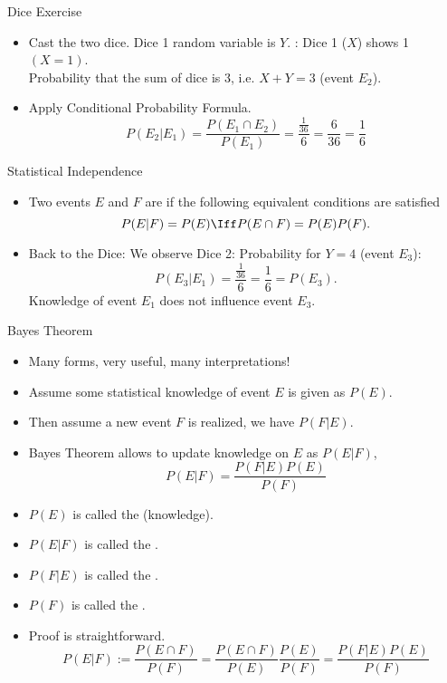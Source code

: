 \documentclass[9pt]{beamer}
\newcommand{\myemph}[1]{{\color{blue}{#1}}}
\begin{document}
\begin{frame}[t]{Dice Exercise}
  \begin{itemize}
  \item Cast the two dice. Dice 1 random variable is $Y$. \myemph{Observed}: Dice 1 ($X$) shows 1 $(X= 1)$.\\
    Probability that the sum of dice is 3, i.e. $X + Y = 3$ (event $E_2$).
    \vfill\pause
  \item Apply Conditional Probability Formula.\pause
    $$
    P(E_2|E_1) = \frac{P(E_1\cap E_2)}{P(E_1)} = \frac{\frac{1}{36}}{6} = \frac6{36} = \frac16
    $$
  \end{itemize}\vfill
\end{frame}


\begin{frame}[t]{Statistical Independence}
  \begin{itemize}
  \item Two events $E$ and $F$ are \myemph{independent} if the following equivalent conditions are satisfied
    $$
    P(E|F) = P(E) \Iff P(E\cap F) = P(E)P(F).
    $$
  \item Back to the Dice: We observe Dice 2: Probability for $Y= 4$ (event $E_3$):
    $$
    P(E_3|E_1) = \frac{\frac{1}{36}}{6} = \frac{1}{6} = P(E_3).
    $$
    Knowledge of event $E_1$ does not influence event $E_3$.
  \end{itemize}
\end{frame}


\begin{frame}[t]{Bayes Theorem}
  \begin{itemize}
  \item Many forms, very useful, many interpretations! \vfill
  \item Assume some statistical knowledge of event $E$ is given as $P(E)$. \vfill
  \item Then assume a new event $F$ is realized, we have $P(F|E)$. \vfill
  \item Bayes Theorem allows to update knowledge on $E$ as $P(E|F)$,
    $$
    P(E|F)=\frac{P(F|E)P(E)}{P(F)}
    $$
    \vfill
  \item $P(E)$ is called the \myemph{prior} (knowledge). \vfill
  \item $P(E|F)$ is called the \myemph{posterior}. \vfill
  \item $P(F|E)$ is called the \myemph{likelihood}. \vfill
  \item $P(F)$ is called the \myemph{evidence}.
  \item Proof is straightforward.
    $$
    P(E|F) := \frac{P(E\cap F)}{P(F)} = \frac{P(E\cap F)}{P(E)}\frac{P(E)}{P(F)} = \frac{P(F|E)P(E)}{P(F)}
    $$
  \end{itemize}
\end{frame}
\end{document}
